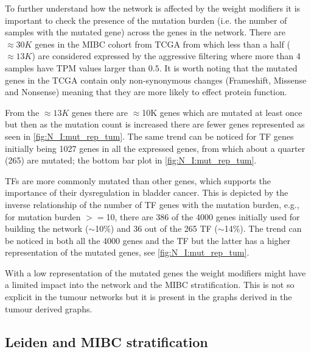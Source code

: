 To further understand how the network is affected by the weight modifiers it is important to check the presence of the mutation burden (i.e. the number of samples with the mutated gene) across the genes in the network. There are $\approx30K$ genes in the MIBC cohort from TCGA from which less than a half ($\approx13K$) are considered expressed by the aggressive filtering where more than 4 samples have TPM values larger than $0.5$. It is worth noting that the mutated genes in the TCGA contain only non-synonymous changes (Frameshift, Missense and Nonsense) meaning that they are more likely to effect protein function.

From the $\approx13K$ genes there are $\approx$10K genes which are mutated at least once but then as the mutation count is increased there are fewer genes represented as seen in \cref{fig:N_I:mut_rep_tum}. The same trend can be noticed for TF genes initially being 1027 genes in all the expressed genes, from which about a quarter (265) are mutated; the bottom bar plot in \cref{fig:N_I:mut_rep_tum}.

TFs are more commonly mutated than other genes, which supports the importance of their dysregulation in bladder cancer. This is depicted by the inverse relationship of the number of TF genes with the mutation burden, e.g., for mutation burden $>=$10, there are 386 of the 4000 genes initially used for building the network ($\sim$10\%) and 36 out of the 265 TF ($\sim$14\%). The trend can be noticed in both all the 4000 genes and the TF but the latter has a higher representation of the mutated genes, see \cref{fig:N_I:mut_rep_tum}. 

With a low representation of the mutated genes the weight modifiers might have a limited impact into the network and the MIBC stratification. This is not so explicit in the tumour networks but it is present in the graphs derived in the tumour derived graphs.


\subsection{Leiden and MIBC stratification} \label{s:N_I:tum_stratification}

